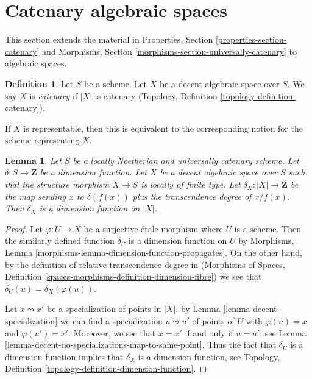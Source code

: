 \documentclass{stacks-project}
\theoremstyle{plain}
\newtheorem{lemma}[subsection]{Lemma}
\theoremstyle{definition}
\newtheorem{definition}[subsection]{Definition}
\theoremstyle{remark}
\numberwithin{equation}{subsection}
\begin{document}
\section{Catenary algebraic spaces}
\label{section-catenary}

\noindent
This section extends the material in
Properties, Section \ref{properties-section-catenary}
and Morphisms, Section \ref{morphisms-section-universally-catenary}
to algebraic spaces.

\begin{definition}
\label{definition-catenary}
Let $S$ be a scheme. Let $X$ be a decent algebraic space over $S$.
We say $X$ is {\it catenary} if $|X|$ is catenary
(Topology, Definition \ref{topology-definition-catenary}).
\end{definition}

\noindent
If $X$ is representable, then this is equivalent to the corresponding notion
for the scheme representing $X$.

\begin{lemma}
\label{lemma-scheme-with-dimension-function}
Let $S$ be a locally Noetherian and universally catenary scheme.
Let $\delta : S \to \mathbf{Z}$ be a dimension function.
Let $X$ be a decent algebraic space over $S$ such that
the structure morphism $X \to S$ is locally of
finite type. Let $\delta_X : |X| \to \mathbf{Z}$ be the map
sending $x$ to $\delta(f(x))$ plus the transcendence degree
of $x/f(x)$. Then $\delta_X$ is a dimension function on $|X|$.
\end{lemma}

\begin{proof}
Let $\varphi : U \to X$ be a surjective \'etale morphism where $U$ is a scheme.
Then the similarly defined function $\delta_U$ is a
dimension function on $U$ by
Morphisms, Lemma \ref{morphisms-lemma-dimension-function-propagates}.
On the other hand, by the definition of relative transcendence degree in
(Morphisms of Spaces, Definition
\ref{spaces-morphisms-definition-dimension-fibre}) we see
that $\delta_U(u) = \delta_X(\varphi(u))$.

\medskip\noindent
Let $x \leadsto x'$ be a specialization of points in $|X|$.
by Lemma \ref{lemma-decent-specialization} we can find
a specialization $u \leadsto u'$ of points of $U$ with
$\varphi(u) = x$ and $\varphi(u') = x'$. Moreover, we see
that $x = x'$ if and only if $u = u'$, see
Lemma \ref{lemma-decent-no-specializations-map-to-same-point}.
Thus the fact that $\delta_U$ is a dimension function implies that
$\delta_X$ is a dimension function, see
Topology, Definition \ref{topology-definition-dimension-function}.
\end{proof}
\end{document}

